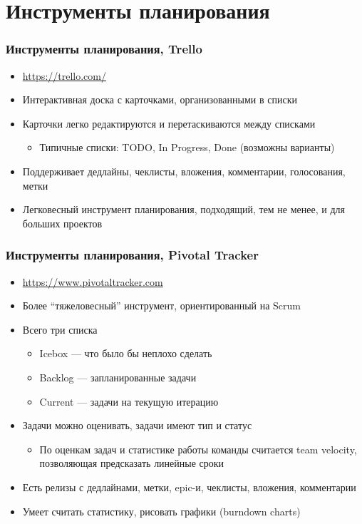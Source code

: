 \documentclass[xetex,mathserif,serif]{beamer}
\begin{document}
	\section{Инструменты планирования}

	\begin{frame}
		\frametitle{Инструменты планирования, Trello}
		\begin{itemize}
			\item \url{https://trello.com/}
			\item Интерактивная доска с карточками, организованными в списки
			\item Карточки легко редактируются и перетаскиваются между списками
			\begin{itemize}
				\item Типичные списки: TODO, In Progress, Done (возможны варианты)
			\end{itemize}
			\item Поддерживает дедлайны, чеклисты, вложения, комментарии, голосования, метки
			\item Легковесный инструмент планирования, подходящий, тем не менее, и для больших проектов
		\end{itemize}
	\end{frame}

	\begin{frame}
		\frametitle{Инструменты планирования, Pivotal Tracker}
		\begin{itemize}
			\item \url{https://www.pivotaltracker.com}
			\item Более ``тяжеловесный'' инструмент, ориентированный на Scrum
			\item Всего три списка
			\begin{itemize}
				\item Icebox --- что было бы неплохо сделать
				\item Backlog --- запланированные задачи
				\item Current --- задачи на текущую итерацию
			\end{itemize}
			\item Задачи можно оценивать, задачи имеют тип и статус
			\begin{itemize}
				\item По оценкам задач и статистике работы команды считается team velocity, позволяющая предсказать линейные сроки
			\end{itemize}
			\item Есть релизы с дедлайнами, метки, epic-и, чеклисты, вложения, комментарии
			\item Умеет считать статистику, рисовать графики (burndown charts)
		\end{itemize}
	\end{frame}
\end{document}
